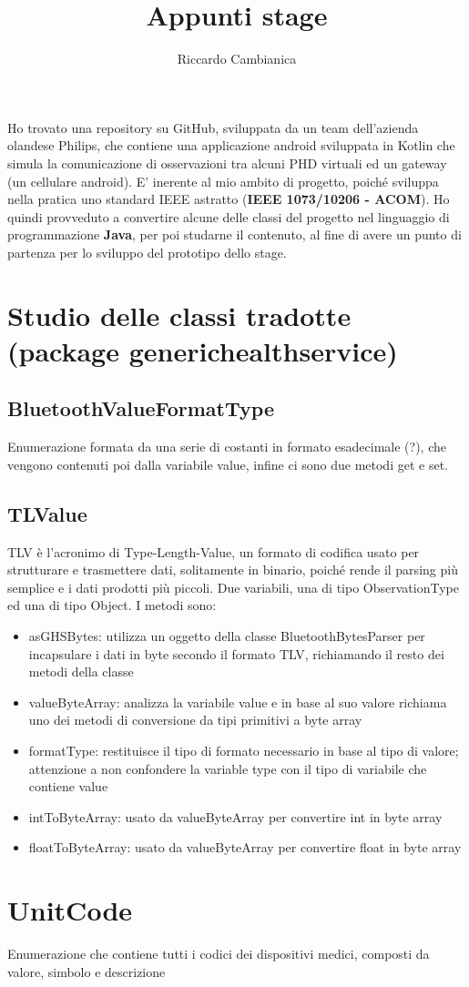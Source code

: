 \documentclass[a4paper]{article}
\title{Appunti stage}
\author{Riccardo Cambianica}
\begin{document}
    \maketitle
    \section*{}
    Ho trovato una repository su GitHub, sviluppata da un team dell'azienda olandese Philips,
    che contiene una applicazione android sviluppata in Kotlin che simula la comunicazione di osservazioni tra
    alcuni PHD virtuali ed un gateway (un cellulare android).
    E' inerente al mio ambito di progetto, poiché sviluppa nella pratica uno standard IEEE 
    astratto (\textbf{IEEE 1073/10206 - ACOM}).
    Ho quindi provveduto a convertire alcune delle classi del progetto nel linguaggio di programmazione
    \textbf{Java}, per poi studarne il contenuto, al fine di avere un punto di partenza per lo sviluppo del prototipo
    dello stage.
    \section{Studio delle classi tradotte (package generichealthservice)}
        \subsection{BluetoothValueFormatType}
            Enumerazione formata da una serie di costanti in formato esadecimale (?), che vengono contenuti poi
            dalla variabile value, infine ci sono due metodi get e set.
        \subsection{TLValue}
            TLV è l'acronimo di Type-Length-Value, un formato di codifica usato per strutturare e trasmettere dati, solitamente in binario,
            poiché rende il parsing più semplice e i dati prodotti più piccoli.
            Due variabili, una di tipo ObservationType ed una di tipo Object.
            \newline
            I metodi sono:         
            \begin{itemize}
                \item asGHSBytes: utilizza un oggetto della classe BluetoothBytesParser per incapsulare i dati in byte secondo il formato TLV, richiamando il resto dei metodi della classe
                \item valueByteArray: analizza la variabile value e in base al suo valore richiama uno dei metodi di conversione da tipi primitivi a byte array
                \item formatType: restituisce il tipo di formato necessario in base al tipo di valore; attenzione a non confondere la variable type con il tipo di variabile che contiene value
                \item intToByteArray: usato da valueByteArray per convertire int in byte array
                \item floatToByteArray: usato da valueByteArray per convertire float in byte array 
            \end{itemize}
    \section{UnitCode}
            Enumerazione che contiene tutti i codici dei dispositivi medici, composti da valore, simbolo e descrizione
\end{document}
